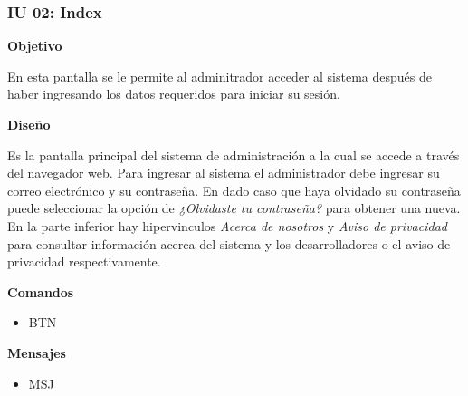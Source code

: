 \subsubsection{IU 02: Index} \label{iu02}
  \textbf{Objetivo} \par
  En esta pantalla se le permite al adminitrador acceder al sistema después de haber ingresando los datos requeridos para iniciar su sesión. \par
  \textbf{Diseño} \par
  Es la pantalla principal del sistema de administración a la cual se accede a través del navegador web. Para ingresar al sistema el administrador debe ingresar su correo electrónico y su contraseña. En dado caso que haya olvidado su contraseña puede seleccionar la opción de \textit{¿Olvidaste tu contraseña?} para obtener una nueva. En la parte inferior hay hipervinculos \textit{Acerca de nosotros} y \textit{Aviso de privacidad} para consultar información acerca del sistema y los desarrolladores o el aviso de privacidad respectivamente.
    \begin{center}
      \label{fig:iu02_fig}
    \end{center}
  \textbf{Comandos}
    \begin{itemize}
      \item BTN %
    \end{itemize}
\textbf{Mensajes}
  \begin{itemize}
     \item MSJ
  \end{itemize}